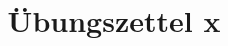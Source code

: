 \documentclass{uebung}
\title{Übungszettel x}	%
\begin{document}
 \maketitle
 \tableofcontents
 \task
 \subtask
 \subtask
 \subtask
 \newpage
\end{document}
